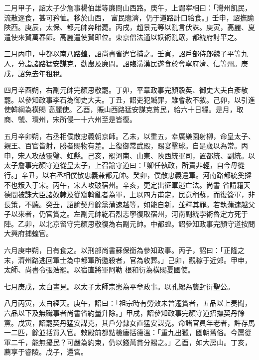 \begin{pinyinscope}
 二月甲子，詔太子少詹事楊伯雄等廉問山西路。庚午，上謂宰相曰：「灣州飢民，流散逐食，甚可矜恤。移於山西，
 富民贍濟，仍于道路計口給食。」壬申，詔撫諭陜西。庚辰，太保、都元帥奔睹薨。丙戌，趙景元等以亂言伏誅。庚寅，高麗、夏遣使來賀萬春節。高麗遣使賀即位。東京僧法通以妖術亂眾，都統府討平之。



 三月丙申，中都以南八路蝗，詔尚書省遣官捕之。壬寅，詔戶部侍郎魏子平等九人，分詣諸路猛安謀克，勸農及廉問。詔臨潢漢民遂食於會寧府濟、信等州。庚戌，詔免去年租稅。



 四月辛酉朔，右副元帥完顏思敬罷。丁卯，平章政事完顏彀英、御史大夫白彥敬罷。以參知政事李石為御史大夫。丁丑，詔吏犯贓罪，雖會赦不敘。己卯，以引進使韓綱為橫賜
 高麗使。乙酉，賑山西路猛安謀克貧民，給六十日糧。是月，取商、虢、環州，宋所侵一十六州至是皆復。



 五月辛卯朔，右丞相僕散忠義朝京師。乙未，以重五，幸廣樂園射柳，命皇太子、親王、百官皆射，勝者賜物有差。上復御常武殿，賜宴擊球。自是歲以為常。丙申，宋人攻破靈璧、虹縣。己亥，罷河南、山東、陜西統軍司，置都統、副統。以太子詹事完顏守道從皇太子，上召諭守道曰：「卿任執政，所責非輕，自今毋從行。」辛丑，以右丞相僕散忠義兼都元帥。癸卯，僕散忠義還軍。河南路都統奚撻不也叛入于宋。丙午，宋人攻破宿州。辛亥，更定出征軍逃亡法。尚書
 省請籍天德間被誅大臣諸奴隸及從窩斡亂者為軍，上以四方甫定，民意稍蘇，而復簽軍，非長策，不聽。癸丑，詔諭契丹餘黨蒲速越等，如能自新，並釋其罪。若執蒲速越父子以來者，仍官賞之。左副元帥紇石烈志寧復取宿州，河南副統孛術魯定方死于陣。乙卯，以北京留守完顏思敬復為右副元帥。中都蝗。詔參知政事完顏守道按問大興府捕蝗官。



 六月庚申朔，日有食之。以刑部尚書蘇保衡為參知政事。丙子，詔曰：「正隆之末，濟州路逃回軍士為中都軍所邀殺者，官為收葬。」己卯，觀稼于近郊。甲申，太師、尚書令張浩罷。以宿直將軍阿勒
 根和衍為橫賜夏國使。



 七月庚戌，太白晝見。以太子太師宗憲為平章政事。以孔總為襲封衍聖公。



 八月丙寅，太白經天。庚午，詔曰：「祖宗時有勞效未曾遷賞者，五品以上奏聞，六品以下及無職事者尚書省約量升除。」甲戌，詔參知政事完顏守道招撫契丹餘黨。戊寅，詔罷契丹猛安謀克，其戶分隸女直猛安謀克。命諸官員年老者，許存馬一二匹，餘並括買入官。敕殿前都點檢唐括德溫：「重九出獵，國朝舊俗。今扈從軍二千，能無擾民？可嚴為約束，仍以錢萬貫分賜之。」乙酉，如大房山。丁亥，薦享于睿陵。戊子，還宮。




\end{pinyinscope}
